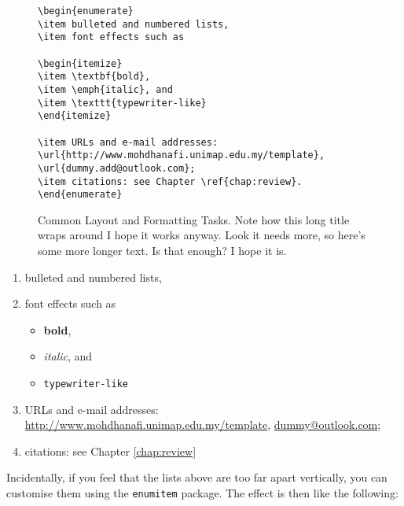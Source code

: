 
\begin{figure}[htb!]
\begin{lstlisting}
\begin{enumerate}
\item bulleted and numbered lists, 
\item font effects such as

\begin{itemize}
\item \textbf{bold}, 
\item \emph{italic}, and 
\item \texttt{typewriter-like}
\end{itemize}

\item URLs and e-mail addresses: \url{http://www.mohdhanafi.unimap.edu.my/template}, \url{dummy.add@outlook.com};
\item citations: see Chapter \ref{chap:review}.
\end{enumerate}
\end{lstlisting}
\caption{Common Layout and Formatting Tasks. Note how this long title wraps around I hope it works anyway. Look it needs more, so here's some more longer text. Is that enough? I hope it is.}\label{fig:simple}
\end{figure}

\begin{enumerate}
\item bulleted and numbered lists, 
\item font effects such as

\begin{itemize}
\item \textbf{bold}, 
\item \emph{italic}, and 
\item \texttt{typewriter-like}
\end{itemize}

\item URLs and e-mail addresses: \url{http://www.mohdhanafi.unimap.edu.my/template}, \url{dummy@outlook.com};
\item citations: see Chapter \ref{chap:review}
\end{enumerate}

Incidentally, if you feel that the lists above are too far apart vertically, you can customise them using the \texttt{enumitem} package. The effect is then like the following:

